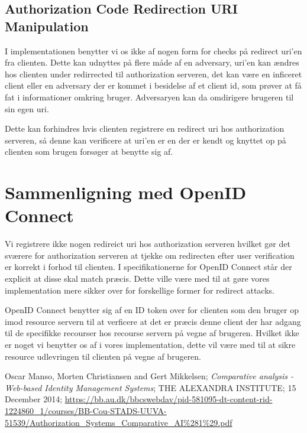 \documentclass[a4paper,12pt]{article}
\theoremstyle{plain}
\theoremstyle{nonumberplain}
\begin{document}
\subsection*{Authorization Code Redirection URI Manipulation}
I implementationen benytter vi os ikke af nogen form for checks på redirect uri'en fra clienten. Dette kan udnyttes på flere måde af en adversary, uri'en kan ændres hos clienten under redirrected til authorization serveren, det kan være en inficeret client eller en adversary der er kommet i besidelse af et client id, som prøver at få fat i informationer omkring bruger. Adversaryen kan da omdirigere brugeren til sin egen uri.

 Dette kan forhindres hvis clienten registrere en redirect uri hos authorization serveren, så denne kan verificere at uri'en er en der er kendt og knyttet op på clienten som brugen forsøger at benytte sig af.


\section*{Sammenligning med OpenID Connect}
Vi registrere ikke nogen redireict uri hos authorization serveren hvilket gør det sværere for authorization serveren at tjekke om redirecten efter user verification er korrekt i forhod til clienten. I specifikationerne for OpenID Connect står der explicit at disse skal match præcis.
Dette ville være med til at gøre vores implementation mere sikker over for forskellige former for redirect attacks.

OpenID Connect benytter sig af en ID token over for clienten som den bruger op imod resource servern til at verficere at det er præcis denne client der har adgang til de specifikke recourser hos recourse servern på vegne af brugeren.
Hvilket ikke er noget vi benytter os af i vores implementation, dette vil være med til at sikre resource udlevringen til clienten på vegne af brugeren.


\begin{thebibliography}{9}

    Oscar Manso, Morten Christiansen and Gert Mikkelsen;
    \emph{Comparative analysis - Web-based Identity Management Systems};
    THE ALEXANDRA INSTITUTE;
    15 December 2014;
    \url{https://bb.au.dk/bbcswebdav/pid-581095-dt-content-rid-1224860_1/courses/BB-Cou-STADS-UUVA-51539/Authorization_Systems_Comparative_AI%281%29.pdf}

\end{thebibliography}
\end{document}
